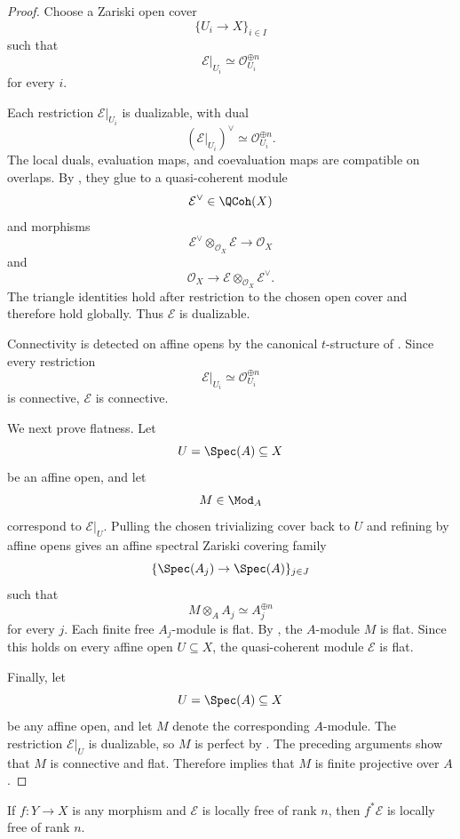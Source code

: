 \begin{proof}
Choose a Zariski open cover
\[
    \{U_i\to X\}_{i\in I}
\]
such that
\[
    \mathcal E|_{U_i}
    \simeq
    \mathcal O_{U_i}^{\oplus n}
\]
for every \(i\).

Each restriction \(\mathcal E|_{U_i}\) is dualizable, with dual
\[
    (\mathcal E|_{U_i})^\vee
    \simeq
    \mathcal O_{U_i}^{\oplus n}.
\]
The local duals, evaluation maps, and coevaluation maps are compatible
on overlaps. By
,
they glue to a quasi-coherent module
\[
    \mathcal E^\vee
    \in
    \QCoh(X)
\]
and morphisms
\[
    \mathcal E^\vee
    \otimes_{\mathcal O_X}
    \mathcal E
    \longrightarrow
    \mathcal O_X
\]
and
\[
    \mathcal O_X
    \longrightarrow
    \mathcal E
    \otimes_{\mathcal O_X}
    \mathcal E^\vee.
\]
The triangle identities hold after restriction to the chosen open cover
and therefore hold globally. Thus \(\mathcal E\) is dualizable.

Connectivity is detected on affine opens by the canonical \(t\)-structure
of
.
Since every restriction
\[
    \mathcal E|_{U_i}
    \simeq
    \mathcal O_{U_i}^{\oplus n}
\]
is connective, \(\mathcal E\) is connective.

We next prove flatness. Let
\[
    U
    =
    \Spec(A)
    \subseteq
    X
\]
be an affine open, and let
\[
    M
    \in
    \Mod_A
\]
correspond to \(\mathcal E|_U\). Pulling the chosen trivializing cover
back to \(U\) and refining by affine opens gives an affine spectral
Zariski covering family
\[
    \{\Spec(A_j)\to\Spec(A)\}_{j\in J}
\]
such that
\[
    M\otimes_AA_j
    \simeq
    A_j^{\oplus n}
\]
for every \(j\). Each finite free \(A_j\)-module is flat. By
,
the \(A\)-module \(M\) is flat. Since this holds on every affine open
\(U\subseteq X\), the quasi-coherent module \(\mathcal E\) is flat.

Finally, let
\[
    U
    =
    \Spec(A)
    \subseteq
    X
\]
be any affine open, and let \(M\) denote the corresponding \(A\)-module.
The restriction \(\mathcal E|_U\) is dualizable, so \(M\) is perfect by
.
The preceding arguments show that \(M\) is connective and flat.
Therefore
implies that \(M\) is finite projective over \(A\).
\end{proof}

\begin{proposition}
\label{prop:base-change-locally-free}
If $f:Y\to X$ is any morphism and $\mathcal E$ is locally free of rank
$n$, then $f^*\mathcal E$ is locally free of rank $n$.
\end{proposition}

